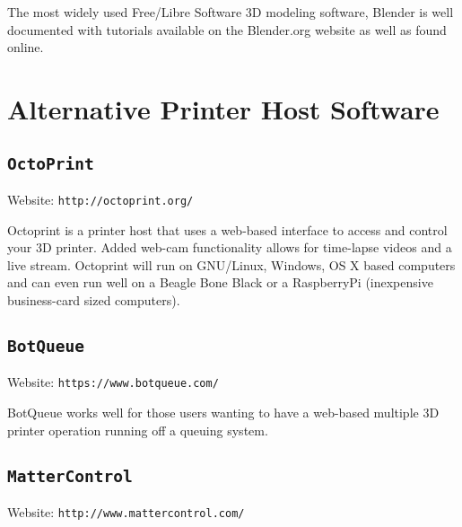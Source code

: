The most widely used Free/Libre Software 3D modeling software, Blender is well documented with tutorials available on the Blender.org website as well as found online.

\begin{comment} %
\subsection{\texttt{Shapesmith}}
\index{Shapesmith}
Website: \texttt{http://shapesmith.net}

Shapesmith is a web-based 3D modeling software. This means there is no required software to get started designing models. Shapesmith is also a great choice for anyone starting out in CAD/ 3D modeling.
\end{comment}

\section{Alternative Printer Host Software}

\subsection{\texttt{OctoPrint}}
Website: \texttt{http://octoprint.org/}

Octoprint is a printer host that uses a web-based interface to access and control your 3D printer. Added web-cam functionality allows for time-lapse videos and a live stream. Octoprint will run on GNU/Linux, Windows, OS X based computers and can even run well on a Beagle Bone Black or a RaspberryPi (inexpensive business-card sized computers).

\subsection{\texttt{BotQueue}}
Website: \texttt{https://www.botqueue.com/}

BotQueue works well for those users wanting to have a web-based multiple 3D printer operation running off a queuing system.


\subsection{\texttt{MatterControl}}
Website: \texttt{http://www.mattercontrol.com/}

